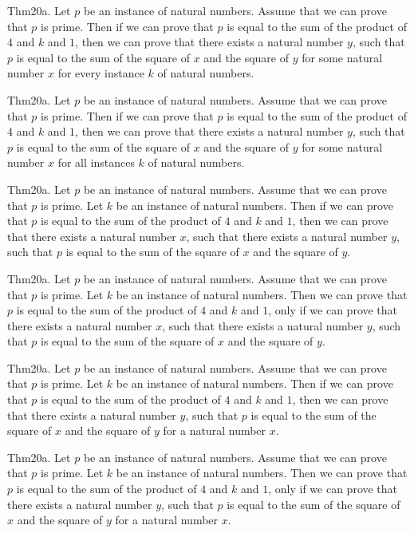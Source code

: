 \documentclass{article}
\begin{document}
Thm20a. Let $p$ be an instance of natural numbers. Assume that we can prove that $p$ is prime. Then if we can prove that $p$ is equal to the sum of the product of $4$ and $k$ and $1$, then we can prove that there exists a natural number $y$, such that $p$ is equal to the sum of the square of $x$ and the square of $y$ for some natural number $x$ for every instance $k$ of natural numbers.

Thm20a. Let $p$ be an instance of natural numbers. Assume that we can prove that $p$ is prime. Then if we can prove that $p$ is equal to the sum of the product of $4$ and $k$ and $1$, then we can prove that there exists a natural number $y$, such that $p$ is equal to the sum of the square of $x$ and the square of $y$ for some natural number $x$ for all instances $k$ of natural numbers.

Thm20a. Let $p$ be an instance of natural numbers. Assume that we can prove that $p$ is prime. Let $k$ be an instance of natural numbers. Then if we can prove that $p$ is equal to the sum of the product of $4$ and $k$ and $1$, then we can prove that there exists a natural number $x$, such that there exists a natural number $y$, such that $p$ is equal to the sum of the square of $x$ and the square of $y$.

Thm20a. Let $p$ be an instance of natural numbers. Assume that we can prove that $p$ is prime. Let $k$ be an instance of natural numbers. Then we can prove that $p$ is equal to the sum of the product of $4$ and $k$ and $1$, only if we can prove that there exists a natural number $x$, such that there exists a natural number $y$, such that $p$ is equal to the sum of the square of $x$ and the square of $y$.

Thm20a. Let $p$ be an instance of natural numbers. Assume that we can prove that $p$ is prime. Let $k$ be an instance of natural numbers. Then if we can prove that $p$ is equal to the sum of the product of $4$ and $k$ and $1$, then we can prove that there exists a natural number $y$, such that $p$ is equal to the sum of the square of $x$ and the square of $y$ for a natural number $x$.

Thm20a. Let $p$ be an instance of natural numbers. Assume that we can prove that $p$ is prime. Let $k$ be an instance of natural numbers. Then we can prove that $p$ is equal to the sum of the product of $4$ and $k$ and $1$, only if we can prove that there exists a natural number $y$, such that $p$ is equal to the sum of the square of $x$ and the square of $y$ for a natural number $x$.
\end{document}
